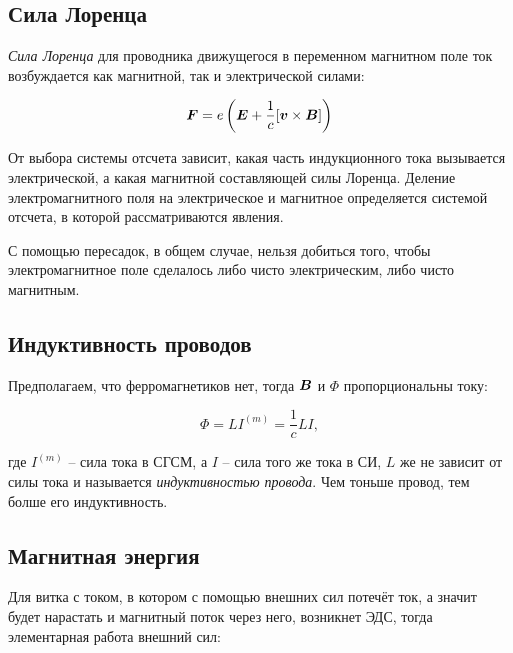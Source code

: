 \subsection{Сила Лоренца}
\begin{to_def}
    \textit{Сила Лоренца} для проводника движущегося в переменном магнитном поле ток возбуждается как магнитной, так и электрической силами:

    \begin{equation}
        \mbox{\boldmath $F$} = e \left(\mbox{\boldmath $E$} + \frac{1}{c} [\mbox{\boldmath $v$} \times \mbox{\boldmath $B$}]\right)
    \end{equation}
\end{to_def}

От выбора системы отсчета зависит, какая часть индукционного тока вызывается электрической, а какая магнитной составляющей силы Лоренца. Деление электромагнитного поля на электрическое и магнитное определяется системой отсчета, в которой рассматриваются явления. 

С помощью пересадок, в общем случае, нельзя добиться того, чтобы электромагнитное поле сделалось либо чисто электрическим, либо чисто магнитным.

\subsection{Индуктивность проводов}
\begin{to_def}
    Предполагаем, что ферромагнетиков нет, тогда $\mbox{\boldmath $B$}$ и $\Phi$ пропорциональны току:    

    \begin{equation}
        \Phi = L I^{(m)} = \frac{1}{c} L I,
    \end{equation}

    где $I^{(m)}$ -- сила тока в СГСМ, а $I$ -- сила того же тока в СИ, $L$ же не зависит от силы тока и называется \textit{индуктивностью провода}. Чем тоньше провод, тем болше его индуктивность.
\end{to_def}





\subsection{Магнитная энергия}

Для витка с током, в котором с помощью внешних сил потечёт ток, а значит будет нарастать и магнитный поток через него, возникнет ЭДС, тогда элементарная работа внешний сил:

